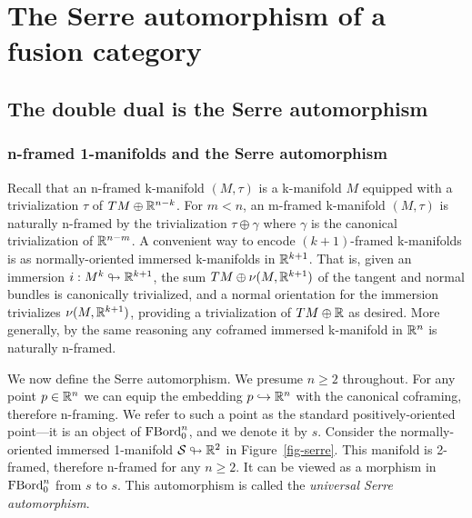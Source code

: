 \documentclass{amsart}
\begin{document}

\section{The Serre automorphism of a fusion category} \label{sec-serre}




\subsection{The double dual is the Serre automorphism} \label{sec-serre-dd}



\subsubsection{n-framed 1-manifolds and the Serre automorphism} \label{sec-serre-oneman}

Recall that an n-framed k-manifold $(M,\tau)$ is a k-manifold $M$ equipped with a trivialization $\tau$ of $TM \oplus \mathbb R^{n-k}$.  For $m < n$, an m-framed k-manifold $(M,\tau)$ is naturally n-framed by the trivialization $\tau \oplus \gamma$ where $\gamma$ is the canonical trivialization of $\mathbb R^{n-m}$.  A convenient way to encode $(k+1)$-framed k-manifolds is as normally-oriented immersed k-manifolds in $\mathbb R^{k+1}$.  That is, given an immersion $i: M^k \looparrowright \mathbb R^{k+1}$, the sum $TM \oplus \nu(M,\mathbb R^{k+1})$ of the tangent and normal bundles is canonically trivialized, and a normal orientation for the immersion trivializes $\nu(M,\mathbb R^{k+1})$, providing a trivialization of $TM \oplus \mathbb R$ as desired.  More generally, by the same reasoning any coframed immersed k-manifold in $\mathbb R^n$ is naturally n-framed.

We now define the Serre automorphism.  We presume $n \geq 2$ throughout.  For any point $p \in \mathbb R^n$ we can equip the embedding $p \hookrightarrow \mathbb R^n$ with the canonical coframing, therefore n-framing.  We refer to such a point as the standard positively-oriented point---it is an object of $\mathrm{FBord}_0^n$, and we denote it by $s$.  Consider the normally-oriented immersed 1-manifold $\mathcal S \looparrowright \mathbb R^2$ in Figure~\ref{fig-serre}.  This manifold is 2-framed, therefore n-framed for any $n \geq 2$.  It can be viewed as a morphism in $\mathrm{FBord}_0^n$ from $s$ to $s$.  This automorphism is called the \emph{universal Serre automorphism}.  
\end{document}
